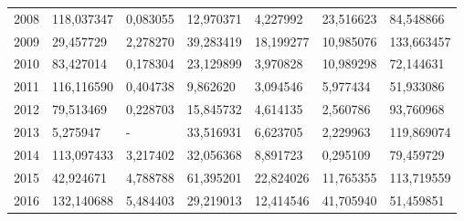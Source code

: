 \begin{table}
\begin{tabular}{p{1cm}p{2cm}p{2cm}p{2cm}p{2cm}p{2cm}p{2cm}}
 2008 &                       118,037347 &                                     0,083055 &                 12,970371 &                          4,227992 &                           23,516623 &                      84,548866 \\
 2009 &                        29,457729 &                                     2,278270 &                 39,283419 &                         18,199277 &                           10,985076 &                     133,663457 \\
 2010 &                        83,427014 &                                     0,178304 &                 23,129899 &                          3,970828 &                           10,989298 &                      72,144631 \\
 2011 &                       116,116590 &                                     0,404738 &                  9,862620 &                          3,094546 &                            5,977434 &                      51,933086 \\
 2012 &                        79,513469 &                                     0,228703 &                 15,845732 &                          4,614135 &                            2,560786 &                      93,760968 \\
 2013 &                         5,275947 &                                            - &                 33,516931 &                          6,623705 &                            2,229963 &                     119,869074 \\
 2014 &                       113,097433 &                                     3,217402 &                 32,056368 &                          8,891723 &                            0,295109 &                      79,459729 \\
 2015 &                        42,924671 &                                     4,788788 &                 61,395201 &                         22,824026 &                           11,765355 &                     113,719559 \\
 2016 &                       132,140688 &                                     5,484403 &                 29,219013 &                         12,414546 &                           41,705940 &                      51,459851 \\
\bottomrule
\end{tabular}
\end{table}
